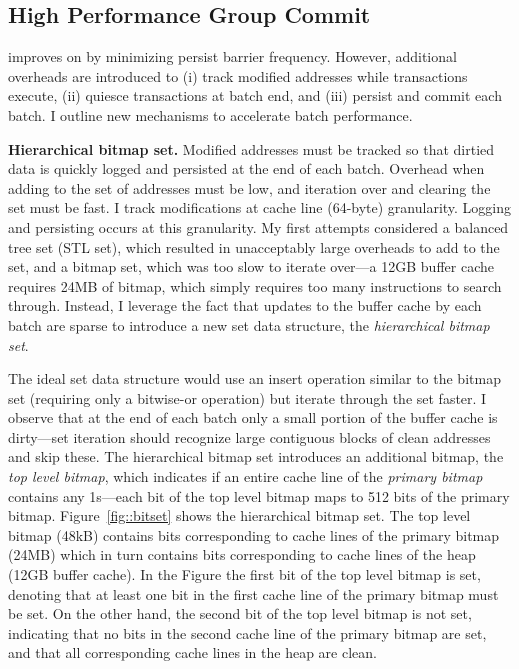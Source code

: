 \subsection{High Performance Group Commit}
\label{sec::OLTP_design:GroupCommit:Performance}

\GroupCommit improves on \InPlace by minimizing persist barrier frequency.
However, additional overheads are introduced to (i) track modified addresses while transactions execute, (ii) quiesce transactions at batch end, and (iii) persist and commit each batch.
I outline new mechanisms to accelerate batch performance.

\textbf{Hierarchical bitmap set.}
Modified addresses must be tracked so that dirtied data is quickly logged and persisted at the end of each batch.
Overhead when adding to the set of addresses must be low, and iteration over and clearing the set must be fast.
I track modifications at cache line (64-byte) granularity.
Logging and persisting occurs at this granularity.
My first attempts considered a balanced tree set (STL set), which resulted in unacceptably large overheads to add to the set, and a bitmap set, which was too slow to iterate over---a 12GB buffer cache requires 24MB of bitmap, which simply requires too many instructions to search through.
Instead, I leverage the fact that updates to the buffer cache by each batch are sparse to introduce a new set data structure, the \emph{hierarchical bitmap set}.



The ideal set data structure would use an insert operation similar to the bitmap set (requiring only a bitwise-or operation) but iterate through the set faster.
I observe that at the end of each batch only a small portion of the buffer cache is dirty---set iteration should recognize large contiguous blocks of clean addresses and skip these.
The hierarchical bitmap set introduces an additional bitmap, the \emph{top level bitmap}, which indicates if an entire cache line of the \emph{primary bitmap} contains any 1s---each bit of the top level bitmap maps to 512 bits of the primary bitmap.
Figure~\ref{fig::bitset} shows the hierarchical bitmap set.
The top level bitmap (48kB) contains bits corresponding to cache lines of the primary bitmap (24MB) which in turn contains bits corresponding to cache lines of the heap (12GB buffer cache).
In the Figure the first bit of the top level bitmap is set, denoting that at least one bit in the first cache line of the primary bitmap must be set.
On the other hand, the second bit of the top level bitmap is not set, indicating that no bits in the second cache line of the primary bitmap are set, and that all corresponding cache lines in the heap are clean.


